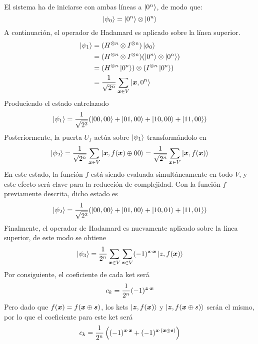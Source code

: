 El sistema ha de iniciarse con ambas líneas a $\ket{0^n}$, de modo que:
%
$$ \ket{\psi_0} = \ket{0^n} \otimes \ket{0^n} $$
%
A continuación, el operador de Hadamard es aplicado sobre la línea superior.
%
\begin{equation}
\begin{split}
\ket{\psi_1} & = (H^{\otimes n} \otimes I^{\otimes n}) \ket{\phi_0} \\
	& = (H^{\otimes n} \otimes I^{\otimes n}) (\ket{0^n} \otimes \ket{0^n}) \\
	& = (H^{\otimes n} \ket{0^n}) \otimes (I^{\otimes n} \ket{0^n}) \\
	& = \frac{1}{\sqrt{2^n}} \sum_{\boldsymbol{x} \in V} \ket{\boldsymbol{x}, 0^n}
\end{split}
\end{equation}
%
Produciendo el estado entrelazado
%
\begin{equation}
\ket{\psi_1} = \frac{1}{\sqrt{2^2}} (\ket{00,00} + \ket{01,00} + \ket{10,00} + 
\ket{11,00})
\end{equation}
%
Posteriormente, la puerta $U_f$ actúa sobre $\ket{\psi_1}$ transformándolo en
%
\begin{equation}
\ket{\psi_2} = \frac{1}{\sqrt{2^n}} \sum_{\boldsymbol{x} \in V} \ket{\boldsymbol{x}, f(\boldsymbol{x}) \oplus 00} = 
\frac{1}{\sqrt{2^n}} \sum_{\boldsymbol{x} \in V} \ket{\boldsymbol{x}, f(\boldsymbol{x})}
\end{equation}
%
En este estado, la función $f$ está siendo evaluada simultáneamente en todo $V$, 
y este efecto será clave para la reducción de complejidad. Con la función $f$ 
previamente descrita, dicho estado es
%
\begin{equation}
\ket{\psi_2} = \frac{1}{\sqrt{2^2}} (\ket{00,00} + \ket{01,00} + \ket{10,01} + 
\ket{11,01})
\end{equation}
%
Finalmente, el operador de Hadamard es nuevamente aplicado sobre la línea 
superior, de este modo se obtiene
%
\begin{equation}
\ket{\psi_3} = \frac{1}{2^n} \sum_{\boldsymbol{x} \in V} \sum_{\boldsymbol{z} \in V}
	(-1)^{\boldsymbol{z} \cdot \boldsymbol{x}} \ket{z, f(\boldsymbol{x})}
\end{equation}
%
Por consiguiente, el coeficiente de cada ket será
%
\begin{equation}
c_k = \frac{1}{2^n} (-1)^{\boldsymbol{z} \cdot \boldsymbol{x}}
\end{equation}
%
Pero dado que $f(\boldsymbol{x}) = f(\boldsymbol{x} \oplus \boldsymbol{s})$, los kets $\ket{\boldsymbol{z}, f(\boldsymbol{x})}$ y
$\ket{\boldsymbol{z}, f(\boldsymbol{x} \oplus s)}$ serán el mismo, por lo que el coeficiente para
este ket será
%
\begin{equation}
c_k = \frac{1}{2^n} \left((-1)^{\boldsymbol{z} \cdot \boldsymbol{x}} + (-1)^{\boldsymbol{z} \cdot (\boldsymbol{x} \oplus 
\boldsymbol{s})}\right)
\end{equation}
